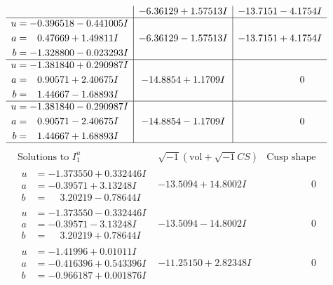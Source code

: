 \documentclass[1p]{elsarticle_modified}
\theoremstyle{definition}
\newcommand{\I}{\sqrt{-1}}
\begin{document}
$$\begin{array}{c|c|c}
 & -6.36129 + 1.57513 I & -13.7151 - 4.1754 I \\ \hline\begin{aligned}
u &= -0.396518 - 0.441005 I \\
a &= \phantom{-}0.47669 + 1.49811 I \\
b &= -1.328800 - 0.023293 I\end{aligned}
 & -6.36129 - 1.57513 I & -13.7151 + 4.1754 I \\ \hline\begin{aligned}
u &= -1.381840 + 0.290987 I \\
a &= \phantom{-}0.90571 + 2.40675 I \\
b &= \phantom{-}1.44667 - 1.68893 I\end{aligned}
 & -14.8854 + 1.1709 I & \phantom{-0.000000 } 0 \\ \hline\begin{aligned}
u &= -1.381840 - 0.290987 I \\
a &= \phantom{-}0.90571 - 2.40675 I \\
b &= \phantom{-}1.44667 + 1.68893 I\end{aligned}
 & -14.8854 - 1.1709 I & \phantom{-0.000000 } 0\\
 \hline 
 \end{array}$$\newpage$$\begin{array}{c|c|c}  
\text{Solutions to }I^u_{1}& \I (\text{vol} + \sqrt{-1}CS) & \text{Cusp shape}\\
 \hline 
\begin{aligned}
u &= -1.373550 + 0.332446 I \\
a &= -0.39571 + 3.13248 I \\
b &= \phantom{-}3.20219 - 0.78644 I\end{aligned}
 & -13.5094 + 14.8002 I & \phantom{-0.000000 } 0 \\ \hline\begin{aligned}
u &= -1.373550 - 0.332446 I \\
a &= -0.39571 - 3.13248 I \\
b &= \phantom{-}3.20219 + 0.78644 I\end{aligned}
 & -13.5094 - 14.8002 I & \phantom{-0.000000 } 0 \\ \hline\begin{aligned}
u &= -1.41996 + 0.01011 I \\
a &= -0.416396 + 0.543396 I \\
b &= -0.966187 + 0.001876 I\end{aligned}
 & -11.25150 + 2.82348 I & \phantom{-0.000000 } 0 \\ \hline\begin{aligned}

\end{aligned}
\end{array}$$
\end{document}
